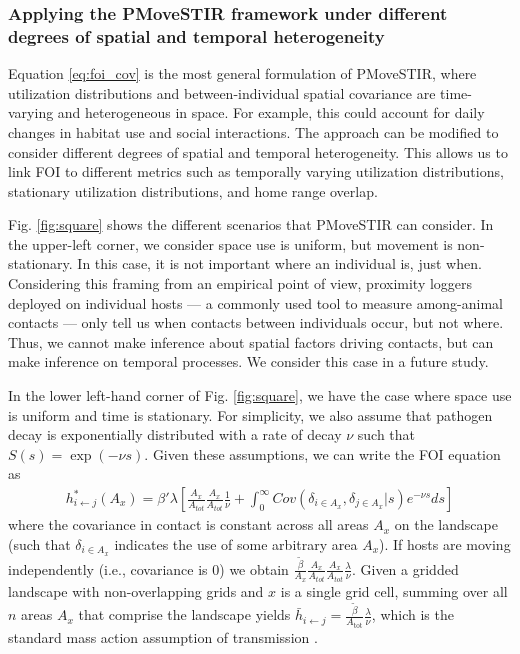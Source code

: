\documentclass[letterpaper]{article}
\begin{document}
\subsubsection*{Applying the PMoveSTIR framework under different degrees of spatial and temporal heterogeneity}

Equation \ref{eq:foi_cov} is the most general formulation of PMoveSTIR, where utilization distributions and between-individual spatial covariance are time-varying and heterogeneous in space. For example, this could account for daily changes in habitat use and social interactions. The approach can be modified to consider different degrees of spatial and temporal heterogeneity. This allows us to link FOI to different metrics such as temporally varying utilization distributions, stationary utilization distributions, and home range overlap. 

Fig. \ref{fig:square} shows the different scenarios that PMoveSTIR can consider. In the upper-left corner, we consider space use is uniform, but movement is non-stationary. In this case, it is not important where an individual is, just when. Considering this framing from an empirical point of view, proximity loggers deployed on individual hosts --- a commonly used tool to measure among-animal contacts \citep{Drewe2012} --- only tell us when contacts between individuals occur, but not where.  Thus, we cannot make inference about spatial factors driving contacts, but can make inference on temporal processes.  We consider this case in a future study.

In the lower left-hand corner of Fig. \ref{fig:square}, we have the case where space use is uniform and time is stationary. For simplicity, we also assume that pathogen decay is exponentially distributed with a rate of decay $\nu$ such that $S(s) = \exp(-\nu s)$. Given these assumptions, we can write the FOI equation as
\begin{equation}
    \begin{aligned}
        h^*_{i \leftarrow j}(A_x) = \beta' \lambda \left[\frac{A_x}{A_{tot}}\frac{A_x}{A_{tot}} \frac{1}{\nu} +  \int_{0}^{\infty} Cov(\delta_{i \in A_x}, \delta_{j \in A_x} | s) e^{-\nu s} ds\right]
    \end{aligned}
    \label{eq:uniform_stationary1}
\end{equation}
where the covariance in contact is constant across all areas $A_x$ on the landscape (such that $\delta_{i \in A_x}$ indicates the use of some arbitrary area $A_x$).  
If hosts are moving independently (i.e., covariance is 0) we obtain $\frac{\tilde{\beta}}{A_x} \frac{A_x}{A_{tot}} \frac{A_x}{A_{tot}}  \frac{\lambda}{\nu}$. Given a gridded landscape with non-overlapping grids and $x$ is a single grid cell, summing over all $n$ areas $A_x$ that comprise the landscape yields $\bar{h}_{i \leftarrow j} =\frac{\tilde{\beta}}{A_\text{tot}} \frac{\lambda}{\nu}$, which is the standard mass action assumption of transmission \citep{McCallum2001}. 
\end{document}
